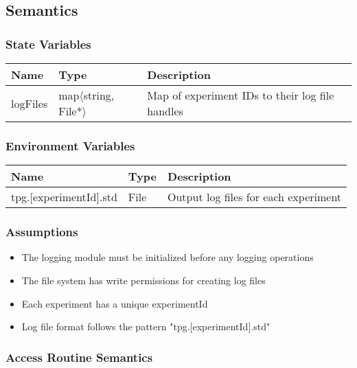\documentclass[12pt, titlepage]{article}
\begin{document}
\subsection{Semantics}

\subsubsection{State Variables}
\begin{center}
  \begin{tabular}{p{3cm} p{4cm} p{7cm}}
    \hline
    \textbf{Name} & \textbf{Type} & \textbf{Description} \\
    \hline
    logFiles & map$\langle$string, File*$\rangle$\> & Map of experiment IDs to their log file handles \\
    \hline
  \end{tabular}
\end{center}

\subsubsection{Environment Variables}
\begin{center}
  \begin{tabular}{p{4cm} p{4cm} p{5cm}}
    \hline
    \textbf{Name} & \textbf{Type} & \textbf{Description} \\
    \hline
    tpg.[experimentId].std & File & Output log files for each experiment \\
    \hline
  \end{tabular}
\end{center}

\subsubsection{Assumptions}
\begin{itemize}
  \item The logging module must be initialized before any logging operations
  \item The file system has write permissions for creating log files
  \item Each experiment has a unique experimentId
  \item Log file format follows the pattern "tpg.[experimentId].std"
\end{itemize}

\subsubsection{Access Routine Semantics}
\end{document}
